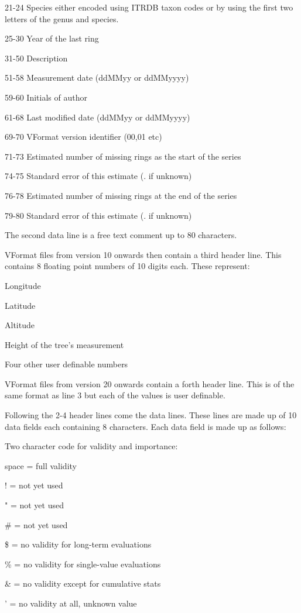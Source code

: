 \documentclass[10pt, headsepline,DIV14,BCOR0.5cm]{scrreprt}
\begin{document}
\begin{itemize*}
\item  21-24 Species either encoded using ITRDB taxon codes or by using the first two letters of the genus and species.
\item  25-30 Year of the last ring
\item  31-50 Description
\item  51-58 Measurement date (ddMMyy or ddMMyyyy)
\item  59-60 Initials of author
\item  61-68 Last modified date (ddMMyy or ddMMyyyy)
\item  69-70 VFormat version identifier (00,01 etc)
\item  71-73 Estimated number of missing rings as the start of the series
\item  74-75 Standard error of this estimate (. if unknown)
\item  76-78 Estimated number of missing rings at the end of the series
\item  79-80 Standard error of this estimate (. if unknown) 
\end{itemize*}

The second data line is a free text comment up to 80 characters.

VFormat files from version 10 onwards then contain a third header line. This contains 8 floating point numbers of 10 digits each. These represent: 
\begin{itemize*}
 \item Longitude
 \item  Latitude
 \item  Altitude
 \item  Height of the tree's measurement
 \item  Four other user definable numbers 
\end{itemize*}

VFormat files from version 20 onwards contain a forth header line. This is of the same format as line 3 but each of the values is user definable.

Following the 2-4 header lines come the data lines. These lines are made up of 10 data fields each containing 8 characters. Each data field is made up as follows: 

\begin{itemize*}
 \item Two character code for validity and importance:
  \begin{itemize*}
  \item space = full validity
  \item ! = not yet used
  \item " = not yet used
  \item \# = not yet used
  \item \$ = no validity for long-term evaluations
  \item \% = no validity for single-value evaluations
  \item \& = no validity except for cumulative stats
  \item ' = no validity at all, unknown value 
  \end{itemize*}
\end{itemize*}
\end{document}
